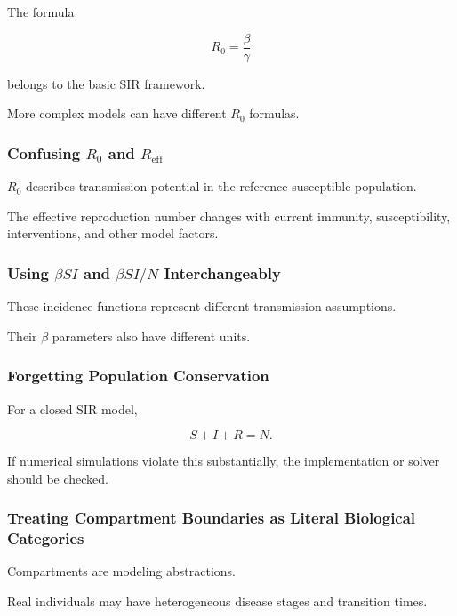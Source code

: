 The formula

\[
R_0=\frac{\beta}{\gamma}
\]

belongs to the basic SIR framework.

More complex models can have different \(R_0\) formulas.

\subsubsection{Confusing \(R_0\) and \(R_{\mathrm{eff}}\)}

\(R_0\) describes transmission potential in the reference susceptible
population.

The effective reproduction number changes with current immunity,
susceptibility, interventions, and other model factors.

\subsubsection{Using \(\beta SI\) and \(\beta SI/N\) Interchangeably}

These incidence functions represent different transmission assumptions.

Their \(\beta\) parameters also have different units.

\subsubsection{Forgetting Population Conservation}

For a closed SIR model,

\[
S+I+R=N.
\]

If numerical simulations violate this substantially, the implementation or
solver should be checked.

\subsubsection{Treating Compartment Boundaries as Literal Biological Categories}

Compartments are modeling abstractions.

Real individuals may have heterogeneous disease stages and transition times.

